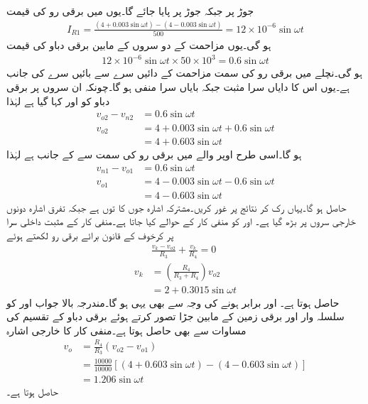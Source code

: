 جوڑ  پر  جبکہ جوڑ  پر  پایا جائے گا۔یوں  میں برقی رو کی قیمت
\begin{align*}
I_{R1}=\frac{\left(4+0.003 \sin \omega t \right)-\left(4-0.003 \sin \omega t \right)}{500}=12 \times 10^{-6} \sin \omega t
\end{align*}
 ہو گی۔یوں مزاحمت  کے دو سروں کے مابین برقی دباو  کی قیمت
\begin{align*}
12 \times 10^{-6} \sin \omega t \times 50 \times 10^3=0.6 \sin \omega t
\end{align*}
ہو گی۔نچلے  میں برقی رو کی سمت مزاحمت کے دائیں سرے سے بائیں سرے کی جانب ہے۔یوں اس کا دایاں سرا مثبت جبکہ بایاں سرا منفی ہو گا۔چونکہ ان سروں پر برقی دباو کو  اور  کہا گیا ہے لہٰذا
\begin{align*}
v_{o2}-v_{n2}&=0.6 \sin \omega t\\
v_{o2}&=4+0.003 \sin \omega t +0.6 \sin \omega t\\
&=4+0.603 \sin \omega t
\end{align*}
ہو گا۔اسی طرح اوپر والے  میں برقی رو کی سمت  سے  کے جانب ہے لہٰذا
\begin{align*}
v_{n1}-v_{o1}&=0.6 \sin \omega t\\
v_{o1}&=4-0.003 \sin \omega t -0.6 \sin \omega t\\
&=4-0.603 \sin \omega t
\end{align*}
حاصل ہو گا۔یہاں رک کر نتائج پر غور کریں۔مشترکہ اشارہ جوں کا توں ہے جبکہ تفرق اشارہ دونوں خارجی سروں  پر  بڑھ گیا ہے۔ اور  کو منفی کار کے حوالے کیا جاتا ہے۔منفی کار  کے مثبت داخلی سرا  پر کرخوف کے قانون برائے برقی رو لکھتے ہوئے
\begin{align*}
&\frac{v_k-v_{o2}}{R_3}+\frac{v_k}{R_4}=0\\
v_k&=\left(\frac{R_4}{R_3+R_4} \right) v_{o2}\\
&=2+0.3015 \sin \omega t
\end{align*}
حاصل ہوتا ہے۔ اور  برابر ہونے کی وجہ سے  بھی یہی ہو گا۔مندرجہ بالا جواب  اور  کو سلسلہ وار  اور برقی زمین کے مابین جڑا تصور کرتے ہوئے برقی دباو کے تقسیم کی مساوات سے بھی حاصل ہوتا ہے۔منفی کار کا خارجی اشارہ
\begin{align*}
v_o&=\frac{R_4}{R_3}{\left(v_{o2}-v_{o1} \right)}\\
&=\frac{10000}{10000} \left[\left(4+0.603 \sin \omega t\right)-\left(4-0.603 \sin \omega t \right) \right]\\
&=1.206 \sin \omega t
\end{align*}
حاصل ہوتا ہے۔

